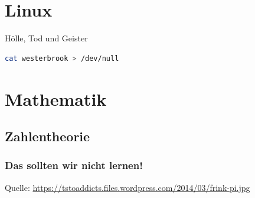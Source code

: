 \section{Linux}

\begin{frame}[fragile]
\begin{block}{Hölle, Tod und Geister}
\begin{lstlisting}[language=Bash]
cat westerbrook > /dev/null
\end{lstlisting}
\end{block}
\end{frame}

\section{Mathematik}

\subsection{Zahlentheorie}

\begin{frame}
\frametitle{Das sollten wir nicht lernen!}
\begin{figure}[ht]
	\centering
\end{figure}
\scriptsize{Quelle: \href{https://tstoaddicts.files.wordpress.com/2014/03/frink-pi.jpg}{\url{https://tstoaddicts.files.wordpress.com/2014/03/frink-pi.jpg}}}
\end{frame}


